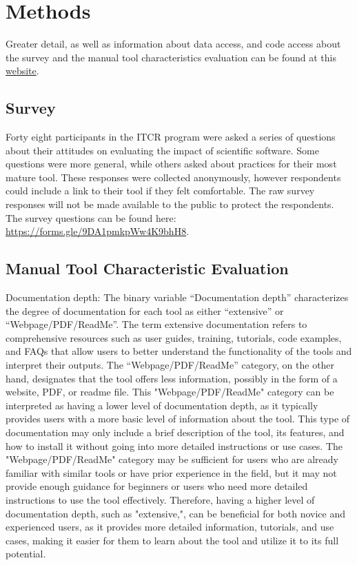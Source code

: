 \documentclass{article}
\begin{document}
\section{Methods}
\label{sec-supp-note-methods}

Greater detail, as well as information about data access, and code access about the survey and the manual tool characteristics evaluation can be found at this \href{https://hutchdatascience.org/ITCR_Metrics_manuscript_website/}{website}.

\subsection{Survey}
Forty eight participants in the ITCR program were asked a series of questions about their attitudes on evaluating the impact of scientific software. Some questions were more general, while others asked about practices for their most mature tool. These responses were collected anonymously, however respondents could include a link to their tool if they felt comfortable. The raw survey responses will not be made available to the public to protect the respondents. The survey questions can be found here: \url{https://forms.gle/9DA1pmkpWw4K9bhH8}.

\subsection{Manual Tool Characteristic Evaluation}

Documentation depth: The binary variable “Documentation depth” characterizes the degree of documentation for each tool as either “extensive” or “Webpage/PDF/ReadMe”. The term extensive documentation refers to comprehensive resources such as user guides, training, tutorials, code examples, and FAQs that allow users to better understand the functionality of the tools and interpret their outputs. The “Webpage/PDF/ReadMe” category, on the other hand, designates that the tool offers less information, possibly in the form of a website, PDF, or readme file. This "Webpage/PDF/ReadMe" category can be interpreted as having a lower level of documentation depth, as it typically provides users with a more basic level of information about the tool. This type of documentation may only include a brief description of the tool, its features, and how to install it without going into more detailed instructions or use cases. The "Webpage/PDF/ReadMe" category may be sufficient for users who are already familiar with similar tools or have prior experience in the field, but it may not provide enough guidance for beginners or users who need more detailed instructions to use the tool effectively. Therefore, having a higher level of documentation depth, such as "extensive,", can be beneficial for both novice and experienced users, as it provides more detailed information, tutorials, and use cases, making it easier for them to learn about the tool and utilize it to its full potential.
\end{document}
